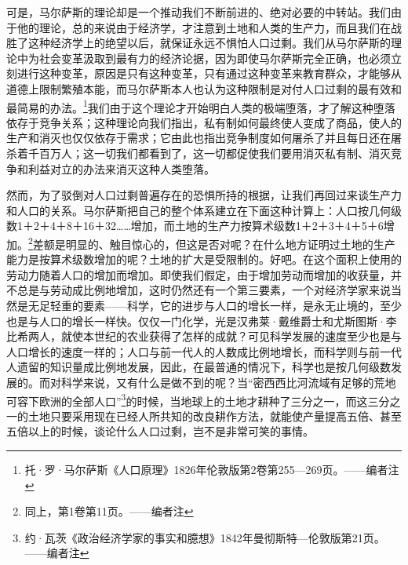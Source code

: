 \documentclass[a4paper,twoside,12pt]{ctexart}
\begin{document}
可是，马尔萨斯的理论却是一个推动我们不断前进的、绝对必要的中转站。我们由于他的理论，总的来说由于经济学，才注意到土地和人类的生产力，而且我们在战胜了这种经济学上的绝望以后，就保证永远不惧怕人口过剩。我们从马尔萨斯的理论中为社会变革汲取到最有力的经济论据，因为即使马尔萨斯完全正确，也必须立刻进行这种变革，原因是只有这种变革，只有通过这种变革来教育群众，才能够从道德上限制繁殖本能，而马尔萨斯本人也认为这种限制是对付人口过剩的最有效和最简易的办法。\footnote{托·罗·马尔萨斯《人口原理》1826年伦敦版第2卷第255—269页。——编者注}我们由于这个理论才开始明白人类的极端堕落，才了解这种堕落依存于竞争关系；这种理论向我们指出，私有制如何最终使人变成了商品，使人的生产和消灭也仅仅依存于需求；它由此也指出竞争制度如何屠杀了并且每日还在屠杀着千百万人；这一切我们都看到了，这一切都促使我们要用消灭私有制、消灭竞争和利益对立的办法来消灭这种人类堕落。

然而，为了驳倒对人口过剩普遍存在的恐惧所持的根据，让我们再回过来谈生产力和人口的关系。马尔萨斯把自己的整个体系建立在下面这种计算上：人口按几何级数1＋2＋4＋8＋16＋32……增加，而土地的生产力按算术级数1＋2＋3＋4＋5＋6增加。\footnote{同上，第1卷第11页。——编者注 }差额是明显的、触目惊心的，但这是否对呢？在什么地方证明过土地的生产能力是按算术级数增加的呢？土地的扩大是受限制的。好吧。在这个面积上使用的劳动力随着人口的增加而增加。即使我们假定，由于增加劳动而增加的收获量，并不总是与劳动成比例地增加，这时仍然还有一个第三要素，一个对经济学家来说当然是无足轻重的要素——科学，它的进步与人口的增长一样，是永无止境的，至少也是与人口的增长一样快。仅仅一门化学，光是汉弗莱·戴维爵士和尤斯图斯·李比希两人，就使本世纪的农业获得了怎样的成就？可见科学发展的速度至少也是与人口增长的速度一样的；人口与前一代人的人数成比例地增长，而科学则与前一代人遗留的知识量成比例地发展，因此，在最普通的情况下，科学也是按几何级数发展的。而对科学来说，又有什么是做不到的呢？当“密西西比河流域有足够的荒地可容下欧洲的全部人口”\footnote{约·瓦茨《政治经济学家的事实和臆想》1842年曼彻斯特—伦敦版第21页。——编者注}的时候，当地球上的土地才耕种了三分之一，而这三分之一的土地只要采用现在已经人所共知的改良耕作方法，就能使产量提高五倍、甚至五倍以上的时候，谈论什么人口过剩，岂不是非常可笑的事情。
\end{document}
